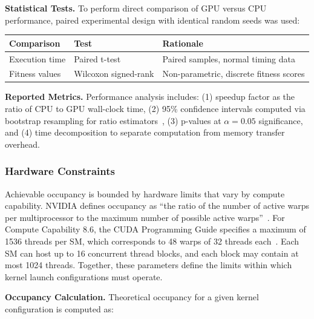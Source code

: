 \textbf{Statistical Tests.} To perform direct comparison of GPU versus CPU performance, paired experimental design with identical random seeds was used:

\begin{center}
\small
\begin{tabular}{@{}lll@{}}
\toprule
\textbf{Comparison} & \textbf{Test} & \textbf{Rationale} \\
\midrule
Execution time & Paired t-test & Paired samples, normal timing data \\
Fitness values & Wilcoxon signed-rank & Non-parametric, discrete fitness scores \\
\bottomrule
\end{tabular}
\end{center}

\textbf{Reported Metrics.} Performance analysis includes: (1) speedup factor as the ratio of CPU to GPU wall-clock time, (2) 95\% confidence intervals computed via bootstrap resampling for ratio estimators~\cite{efron1994bootstrap}, (3) p-values at $\alpha=0.05$ significance, and (4) time decomposition to separate computation from memory transfer overhead.





  \subsubsection*{Hardware Constraints}

  Achievable occupancy is bounded by hardware limits that vary by compute capability. NVIDIA defines occupancy as ``the ratio of the number of active warps per multiprocessor to the maximum number of possible active warps''~\cite{nvidia2024cuda}. For Compute Capability 8.6, the CUDA Programming Guide specifies a maximum of 1536 threads per SM, which corresponds to 48 warps of 32 threads each~\cite{nvidia2024programming}. Each SM can host up to 16 concurrent thread blocks, and each block may contain at most 1024 threads. Together, these parameters define the limits within which kernel launch configurations must operate.

  \textbf{Occupancy Calculation.} Theoretical occupancy for a given kernel configuration is computed as:

